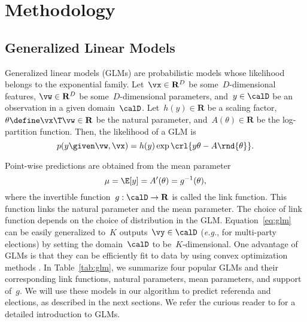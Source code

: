 \section{Methodology}%
\label{sec:methodology}


\subsection{Generalized Linear Models}%
Generalized linear models (GLMs) are probabilistic models whose likelihood belongs to the exponential family.
Let~$\vx \in \mathbf{R}^D$ be some~$D$-dimensional features, $\vw \in \mathbf{R}^D$ be some~$D$-dimensional parameters, and~$y \in \calD$ be an observation in a given domain~$\calD$.
Let~$h(y) \in \mathbf{R}$ be a scaling factor, $\theta \define \vx\T \vw \in \mathbf{R}$ be the natural parameter, and~$A(\theta) \in \mathbf{R}$ be the log-partition function.
Then, the likelihood of a GLM is
\begin{equation}
	\label{eq:glm}
	p(y \given \vw, \vx) = h(y) \exp{\crl{y \theta - A \rnd{\theta}}}.
\end{equation}

Point-wise predictions are obtained from the mean parameter
\begin{equation*}
	\mu = \E[y] = A'(\theta) = g^{-1}(\theta),
\end{equation*}
where the invertible function~$g : \calD \rightarrow \mathbf{R}$ is called the link function.
This function links the natural parameter and the mean parameter.
The choice of link function depends on the choice of distribution in the GLM.
Equation~\eqref{eq:glm} can be easily generalized to~$K$ outputs~$\vy \in \calD$ (\textit{e.g.}, for multi-party elections) by setting the domain~$\calD$ to be~$K$-dimensional.
One advantage of GLMs is that they can be efficiently fit to data by using convex optimization methods \cite{boyd2004convex}.
In Table~\ref{tab:glm}, we summarize four popular GLMs and their corresponding link functions, natural parameters, mean parameters, and support of~$g$.
We will use these models in our algorithm to predict referenda and elections, as described in the next sections.
We refer the curious reader to \citet[Chapter~9]{murphy2012machine} for a detailed introduction to GLMs.

